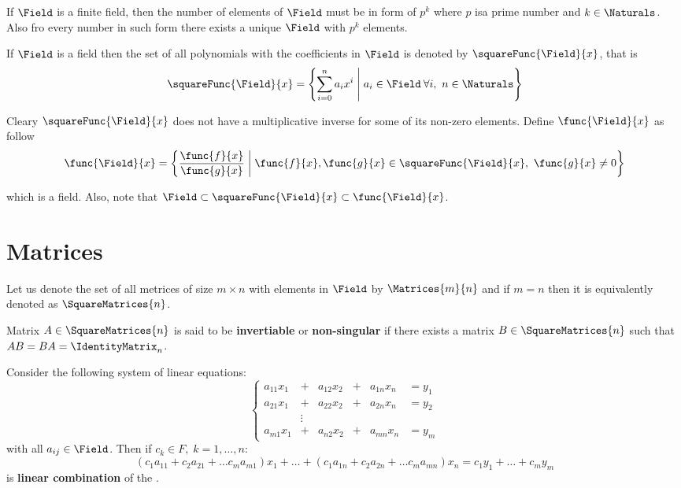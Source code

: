 \begin{theorem}
    If \(\Field\) is a finite field, then the number of elements of \(\Field\) must be in form of \(p^k\) where \(p\) isa prime number and \(k \in \Naturals\). Also fro every number in such form there exists a unique \(\Field\) with \(p^k\) elements.
\end{theorem}

If \(\Field\) is a field then the set of all polynomials with the coefficients in \(\Field\) is denoted by \(\squareFunc{\Field}{x}\), that is
\begin{equation*}
    \squareFunc{\Field}{x} = \left\{ \sum_{i = 0}^{n} a_i x^i \; \middle| \; a_i \in \Field \: \forall i,\ n \in \Naturals \right\}
\end{equation*}

Cleary \(\squareFunc{\Field}{x}\) does not have a multiplicative inverse for some of its non-zero elements. Define \(\func{\Field}{x}\) as follow
\begin{equation*}
    \func{\Field}{x} = \left\{ \frac{\func{f}{x}}{\func{g}{x}} \; \middle| \; \func{f}{x}, \func{g}{x} \in \squareFunc{\Field}{x}, \  \func{g}{x} \neq 0 \right\}
\end{equation*}

which is a field. Also, note that \(\Field \subset \squareFunc{\Field}{x} \subset \func{\Field}{x}\).
\section{Matrices}
Let us denote the set of all metrices of size \(m \times n\) with elements in \(\Field\) by \( \Matrices{m}{n} \) and if \(m = n\) then it is equivalently denoted as \(\SquareMatrices{n}\).

Matrix \(A \in \SquareMatrices{n}\) is said to be \textbf{invertiable} or \textbf{non-singular} if there exists a matrix \linebreak \(B \in \SquareMatrices{n}\) such that \(AB = BA = \IdentityMatrix_n\).

Consider the following system of linear equations:
\begin{equation}
    \left\{
    \begin{alignedat}{3} \label{eq:LinearEquation}
        a_{11}x_1 & +{} &  a_{12}x_2 & +{} & a_{1n}x_n & = y_1 \\
        a_{21}x_1 & +{} &  a_{22}x_2 & +{} & a_{2n}x_n & = y_2 \\
        & \vdots\\
        a_{m1}x_1 & +{} &  a_{n2}x_2 & +{} & a_{mn}x_n & = y_m
    \end{alignedat}
    \right.
\end{equation}
with all \(a_{ij} \in \Field\). Then if \(c_k \in F,\; k = 1, \dots, n\):
\begin{equation*}
    (c_1 a_{11} + c_2 a_{21} + \dots c_m a_{m1})x_1 + \dots + (c_1 a_{1n} + c_2 a_{2n} + \dots c_m a_{mn})x_n = c_1 y_1 + \dots + c_m y_m
\end{equation*}
is \textbf{linear combination} of the .

